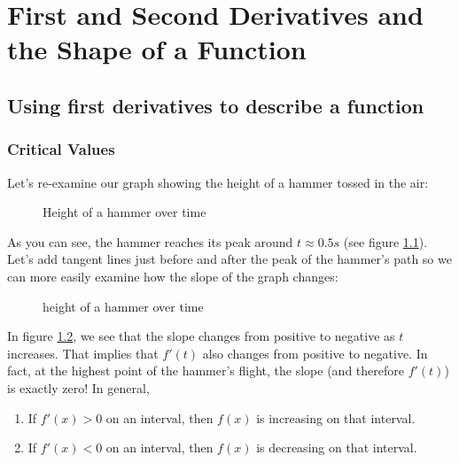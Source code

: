 \chapter{First and Second Derivatives and the Shape of a Function}
\section{Using first derivatives to describe a function}
\subsection{Critical Values}

Let's re-examine our graph showing the height of a hammer tossed in the air:


\begin{figure}
\centering
{}
\caption{Height of a hammer over time}
\label{ref:hammerh}
\end{figure}


As you can see, the hammer reaches its peak around $t \approx 0.5s$ (see 
figure \ref{ref:hammerh}). Let's add tangent lines just before and after the 
peak of the hammer's path so we can more easily examine how the slope of the 
graph changes:

\begin{figure}
\centering
{}
\caption{height of a hammer over time}
\label{ref:hammerh2}
\end{figure}


In figure \ref{ref:hammerh2}, we see that the slope changes from positive to 
negative as $t$ increases. That implies that $f'(t)$ also changes from positive 
to negative. In fact, at the highest point of the hammer's flight, the slope 
(and therefore $f'(t)$) is exactly zero! In general, 
\begin{enumerate}
	\item If $f'(x)>0$ on an interval, then $f(x)$ is increasing on that 
	interval.
	\item If $f'(x)<0$ on an interval, then $f(x)$ is decreasing on that 
	interval. 
\end{enumerate}

